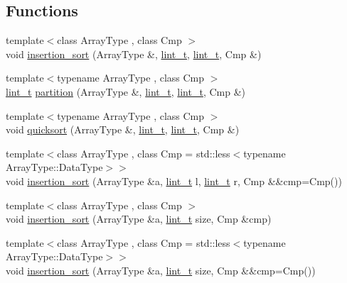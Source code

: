 \subsection*{Functions}
\begin{DoxyCompactItemize}
\item 
{\footnotesize template$<$class Array\+Type , class Cmp $>$ }\\void \hyperlink{namespace_designar_a9fec85a7dda46bb4840bf066c8483853}{insertion\+\_\+sort} (Array\+Type \&, \hyperlink{namespace_designar_a9d113d66a39e82b73727c72cd3a52f73}{lint\+\_\+t}, \hyperlink{namespace_designar_a9d113d66a39e82b73727c72cd3a52f73}{lint\+\_\+t}, Cmp \&)
\item 
{\footnotesize template$<$typename Array\+Type , class Cmp $>$ }\\\hyperlink{namespace_designar_a9d113d66a39e82b73727c72cd3a52f73}{lint\+\_\+t} \hyperlink{namespace_designar_a43b31dd9df26bd0c268d2aa653de6cf0}{partition} (Array\+Type \&, \hyperlink{namespace_designar_a9d113d66a39e82b73727c72cd3a52f73}{lint\+\_\+t}, \hyperlink{namespace_designar_a9d113d66a39e82b73727c72cd3a52f73}{lint\+\_\+t}, Cmp \&)
\item 
{\footnotesize template$<$typename Array\+Type , class Cmp $>$ }\\void \hyperlink{namespace_designar_a2e26fd2dcbb26e5ffc96a960dd4caa94}{quicksort} (Array\+Type \&, \hyperlink{namespace_designar_a9d113d66a39e82b73727c72cd3a52f73}{lint\+\_\+t}, \hyperlink{namespace_designar_a9d113d66a39e82b73727c72cd3a52f73}{lint\+\_\+t}, Cmp \&)
\item 
{\footnotesize template$<$class Array\+Type , class Cmp  = std\+::less$<$typename Array\+Type\+::\+Data\+Type$>$$>$ }\\void \hyperlink{namespace_designar_ab2f897d6db2113316fee5efcd50a459d}{insertion\+\_\+sort} (Array\+Type \&a, \hyperlink{namespace_designar_a9d113d66a39e82b73727c72cd3a52f73}{lint\+\_\+t} l, \hyperlink{namespace_designar_a9d113d66a39e82b73727c72cd3a52f73}{lint\+\_\+t} r, Cmp \&\&cmp=Cmp())
\item 
{\footnotesize template$<$class Array\+Type , class Cmp $>$ }\\void \hyperlink{namespace_designar_a54b704ec22eb8fe7136b1bda64daf3a7}{insertion\+\_\+sort} (Array\+Type \&a, \hyperlink{namespace_designar_a9d113d66a39e82b73727c72cd3a52f73}{lint\+\_\+t} size, Cmp \&cmp)
\item 
{\footnotesize template$<$class Array\+Type , class Cmp  = std\+::less$<$typename Array\+Type\+::\+Data\+Type$>$$>$ }\\void \hyperlink{namespace_designar_a8655d6fa8772dee92565bf7475e5612d}{insertion\+\_\+sort} (Array\+Type \&a, \hyperlink{namespace_designar_a9d113d66a39e82b73727c72cd3a52f73}{lint\+\_\+t} size, Cmp \&\&cmp=Cmp())

\end{DoxyCompactItemize}
